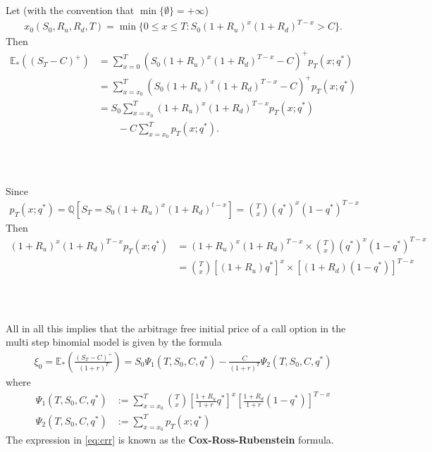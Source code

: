 \documentclass{beamer}
\numberwithin{equation}{section}
\begin{document}
\begin{frame}\frametitle{{\normalsize \secname} \\ {\large \subsecname}}
    Let (with the convention that $\min\{ \emptyset \} = + \infty$)
    \begingroup
    \footnotesize
    \begin{align}
        x_0(S_0, R_u, R_d, T) = \min\{ 0 \leq x \leq T : S_0(1 + R_u)^x(1+R_d)^{T-x} > C\}.
    \end{align}
    \endgroup
    Then
    \begingroup
    \footnotesize
    \begin{align}
        \mathbb{E}_*\left( (S_T - C)^+\right) &= \sum_{x=0}^T \left( S_0(1+R_u)^x(1 + R_d)^{T-x}  - C \right)^+ p_T(x; q^*)\\
        &= \sum_{x=x_0}^T \left( S_0(1+R_u)^x(1 + R_d)^{T-x}  - C \right)^+ p_T(x; q^*)\\
        &= S_0 \sum_{x=x_0}^T (1+R_u)^x(1 + R_d)^{T-x}p_T(x; q^*)
        \\ &\qquad
        - C \sum_{x=x_0}^T p_T (x; q^*).
    \end{align}
    \endgroup
\end{frame}

\begin{frame}\frametitle{{\normalsize \secname} \\ {\large \subsecname}}
    Since
    \begingroup
    \footnotesize
    \begin{align}
        p_T(x; q^*) = \mathbb{Q} \left[ S_T = S_0(1 + R_u)^x(1+R_d)^{t-x} \right] = \binom{T}{x}(q^*)^x(1-q^*)^{T-x}
    \end{align}
    \endgroup
    Then
    \begingroup
    \footnotesize
    \begin{align}
    (1+R_u)^x(1+R_d)^{T-x} p_T(x; q^*) &= (1+R_u)^x(1+R_d)^{T-x} \times \binom{T}{x} (q^*)^x(1-q^*)^{T-x}\\
    &= \binom{T}{x} [(1 + R_u)q^*]^x \times [(1+R_d)(1-q^*)]^{T-x}
    \end{align}
    \endgroup
\end{frame}

\begin{frame}\frametitle{{\normalsize \secname} \\ {\large \subsecname}}
    All in all this implies that the arbitrage free initial price of a call option in the multi step binomial model is given by the formula
    \begingroup
    \small
    \begin{align}\label{eq:crr}
        \xi_0 = \mathbb{E}_* \left( \frac{(S_T - C)^+}{(1+r)^T} \right) = S_0 \Psi_1(T, S_0, C, q^*) - \frac{C}{(1+r)^T} \Psi_2(T, S_0, C, q^*)
    \end{align}
    \endgroup
    where
    \begingroup
    \small
    \begin{align}
        \Psi_1 (T, S_0, C, q^*) &:= \sum_{x = x_0}^T \binom{T}{x} \left[ \frac{1 + R_u}{1+r} q^* \right]^x\left[ \frac{1+R_d}{1+r}(1 - q^*) \right]^{T-x}\\
        \Psi_2 (T, S_0, C, q^*) &:= \sum_{x = x_0}^T p_T(x; q^*)
    \end{align}
    \endgroup
    The expression in \eqref{eq:crr} is known as the \textbf{Cox-Ross-Rubenstein} formula.
\end{frame}
\end{document}
